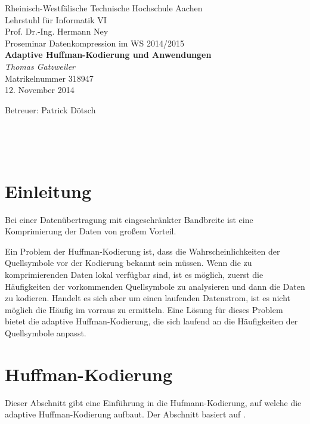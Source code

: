 \documentclass[twoside,11pt,a4paper]{article}
\theoremstyle{break}
\begin{document}
\pagestyle{empty}
\begin{center}
    Rheinisch-Westfälische Technische Hochschule Aachen \\
    Lehrstuhl für Informatik VI \\
    Prof. Dr.-Ing. Hermann Ney\\[6ex]
    Proseminar Datenkompression im WS 2014/2015\\[12ex]

    \LARGE
    \textbf{Adaptive Huffman-Kodierung und Anwendungen} \\[6ex]
    \textit{Thomas Gatzweiler} \\[6ex]
    \Large
    Matrikelnummer 318947 \\[6ex]
    12. November 2014

    \vfill
    \Large Betreuer: Patrick Dötsch
\end{center}

\newpage
\
\newpage

\pagestyle{headings}
\tableofcontents
\listoftables
\listoffigures
\newpage
\pagestyle{empty}
\
\newpage
\pagestyle{headings}


\setlength{\parindent}{0pt}
\setlength{\parskip}{2ex plus 0.5ex minus 0.2ex}

\nocite{*}

\section{Einleitung}

Bei einer Datenübertragung mit eingeschränkter Bandbreite ist eine Komprimierung
der Daten von großem Vorteil.

Ein Problem der Huffman-Kodierung ist, dass die Wahrscheinlichkeiten der
Quellsymbole vor der Kodierung bekannt sein müssen. Wenn die zu komprimierenden
Daten lokal verfügbar sind, ist es möglich, zuerst die Häufigkeiten der
vorkommenden Quellsymbole zu analysieren und dann die Daten zu kodieren. Handelt
es sich aber um einen laufenden Datenstrom, ist es nicht möglich die Häufig im
vorraus zu ermitteln. Eine Lösung für dieses Problem bietet die adaptive
Huffman-Kodierung, die sich laufend an die Häufigkeiten der Quellsymbole
anpasst.

\section{Huffman-Kodierung}

Dieser Abschnitt gibt eine Einführung in die Hufmann-Kodierung, auf welche die
adaptive Huffman-Kodierung aufbaut. Der Abschnitt basiert auf \cite[S.
214-228]{Salomon:2010}.
\end{document}
